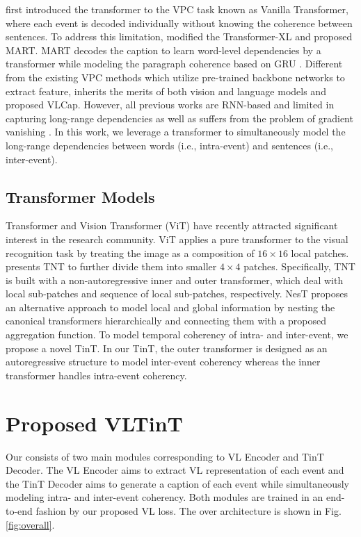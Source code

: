\documentclass[letterpaper]{article} \usepackage{aaai23}  \usepackage{times}  \usepackage{helvet}  \usepackage{courier}  \usepackage[hyphens]{url}  \usepackage{graphicx} \urlstyle{rm} \def\UrlFont{\rm}  \usepackage{natbib}  \usepackage{caption} \frenchspacing  \setlength{\pdfpagewidth}{8.5in}  \setlength{\pdfpageheight}{11in}  \usepackage{algorithm}
\newcommand{\encoder}{VL Encoder\xspace}
\begin{document}
\cite{zhou2018end} first introduced the transformer to the VPC task known as Vanilla Transformer, where each event is decoded individually without knowing the coherence between sentences. 
To address this limitation, \cite{lei2020mart} modified the Transformer-XL \cite{dai2019transformer} and proposed MART. 
MART decodes the caption to learn word-level dependencies by a transformer while modeling the paragraph coherence based on GRU \cite{chung2014empirical}.  Different from the existing VPC methods which utilize pre-trained backbone networks to extract feature, \cite{yamazaki2022vlcap} inherits the merits of both vision and language models and proposed VLCap. However, all previous works are RNN-based and limited in capturing long-range dependencies as well as suffers from the problem of gradient vanishing \cite{pascanu2013difficulty}. 
In this work, we leverage a transformer to simultaneously model the long-range dependencies between words (i.e., intra-event) and sentences (i.e., inter-event). 

\subsection{Transformer Models}
Transformer \cite{vaswani2017attention} and Vision Transformer (ViT) \cite{dosovitskiy2020image} have recently attracted significant interest in the research community. ViT applies a pure transformer to the visual recognition task by treating the image as a composition of $16\times16$ local patches. 
\cite{Han2021} presents TNT to further divide them into smaller $4\times4$ patches. Specifically, TNT is built with a non-autoregressive inner and outer transformer, which deal with local sub-patches and sequence of local sub-patches, respectively. NesT \cite{Zhang2021} proposes an alternative approach to model local and global information by nesting the canonical transformers hierarchically and connecting them with a proposed aggregation function. 
To model temporal coherency of intra- and inter-event, we propose a novel TinT. In our TinT, the outer transformer is designed as an autoregressive structure to model inter-event coherency whereas the inner transformer handles intra-event coherency.


\section{Proposed VLTinT}

Our \model consists of two main modules corresponding to \encoder and TinT Decoder. The \encoder aims to extract VL representation of each event and the TinT Decoder aims to generate a caption of each event while simultaneously modeling intra- and inter-event coherency. Both modules are trained in an end-to-end fashion by our proposed VL loss. 
The over architecture is shown in Fig. \ref{fig:overall}. 
\end{document}
